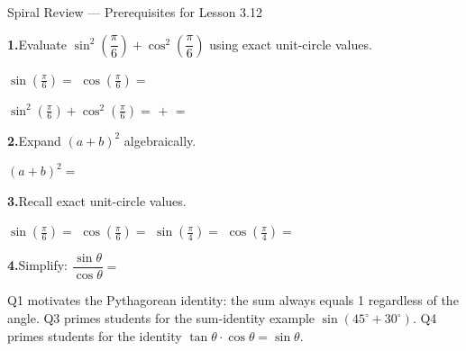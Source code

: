 \documentclass[10pt]{article}
\begin{document}
\namedateperiod

\vspace{0.10in}

\begin{notesbox}{Spiral Review --- Prerequisites for Lesson 3.12}

\textbf{1.}\quad Evaluate $\sin^2\!\left(\dfrac{\pi}{6}\right) + \cos^2\!\left(\dfrac{\pi}{6}\right)$
using exact unit-circle values.

\vspace{4pt}
$\sin\!\left(\tfrac{\pi}{6}\right) = $ \quad
$\cos\!\left(\tfrac{\pi}{6}\right) = $ 

\vspace{6pt}
$\sin^2\!\left(\tfrac{\pi}{6}\right) + \cos^2\!\left(\tfrac{\pi}{6}\right)
= $  $+$  $=$ 

\vspace{0.14in}
\textbf{2.}\quad Expand $(a + b)^2$ algebraically.

\vspace{4pt}
$(a + b)^2 = $ 

\vspace{0.14in}
\textbf{3.}\quad Recall exact unit-circle values.

\vspace{4pt}
$\sin\!\left(\tfrac{\pi}{6}\right) = $ \hspace{0.6cm}
$\cos\!\left(\tfrac{\pi}{6}\right) = $ \hspace{0.6cm}
$\sin\!\left(\tfrac{\pi}{4}\right) = $ \hspace{0.6cm}
$\cos\!\left(\tfrac{\pi}{4}\right) = $ 

\vspace{0.14in}
\textbf{4.}\quad Simplify: $\dfrac{\sin\theta}{\cos\theta} = $ \ans{$\tan\theta$}

\begin{teachernote}
Q1 motivates the Pythagorean identity: the sum always equals 1 regardless of the angle.
Q3 primes students for the sum-identity example $\sin(45^\circ + 30^\circ)$.
Q4 primes students for the identity $\tan\theta \cdot \cos\theta = \sin\theta$.
\end{teachernote}

\end{notesbox}
\end{document}
